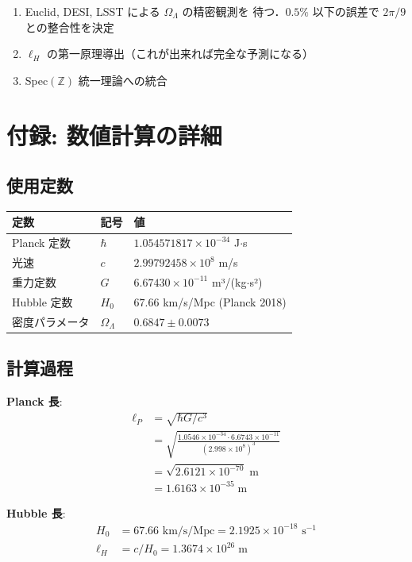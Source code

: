 \documentclass[11pt,a4paper]{article}
\begin{document}
\begin{enumerate}
\item Euclid, DESI, LSST による $\Omega_\Lambda$ の精密観測を
待つ．$0.5\%$ 以下の誤差で $2\pi/9$ との整合性を決定
\item $\ell_H$ の第一原理導出（これが出来れば完全な予測になる）
\item Spec$(\mathbb{Z})$ 統一理論への統合
\end{enumerate}

\section{付録: 数値計算の詳細}

\subsection{使用定数}

\begin{center}
\begin{tabular}{lll}
\toprule
定数 & 記号 & 値 \\
\midrule
Planck 定数 & $\hbar$ & $1.054571817\times 10^{-34}$ J$\cdot$s \\
光速 & $c$ & $2.99792458\times 10^{8}$ m/s \\
重力定数 & $G$ & $6.67430\times 10^{-11}$ m³/(kg$\cdot$s²) \\
Hubble 定数 & $H_0$ & $67.66$ km/s/Mpc (Planck 2018) \\
密度パラメータ & $\Omega_\Lambda$ & $0.6847 \pm 0.0073$ \\
\bottomrule
\end{tabular}
\end{center}

\subsection{計算過程}

\textbf{Planck 長}:
\begin{align}
\ell_P &= \sqrt{\hbar G/c^3}\\
&= \sqrt{\frac{1.0546\times 10^{-34}\cdot 6.6743\times 10^{-11}}{(2.998\times 10^{8})^3}}\\
&= \sqrt{2.6121\times 10^{-70}}\;\text{m}\\
&= 1.6163\times 10^{-35}\;\text{m}
\end{align}

\textbf{Hubble 長}:
\begin{align}
H_0 &= 67.66\text{ km/s/Mpc} = 2.1925\times 10^{-18}\text{ s}^{-1}\\
\ell_H &= c/H_0 = 1.3674\times 10^{26}\;\text{m}
\end{align}
\end{document}
